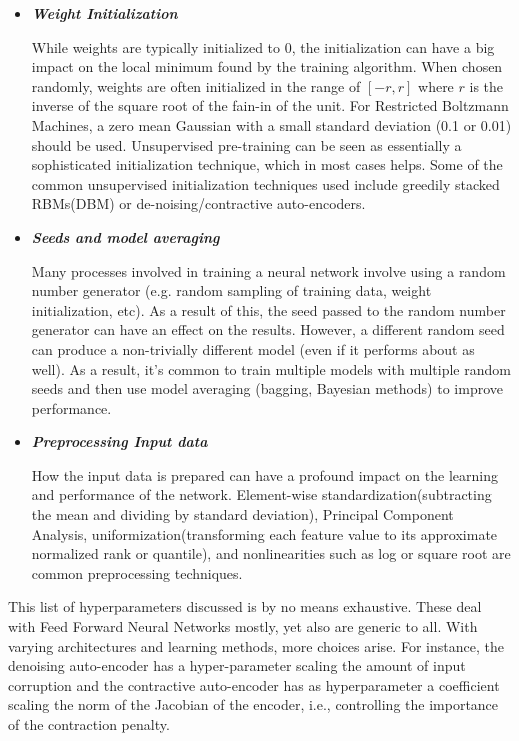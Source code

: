 \documentclass[twoside]{article}
\begin{document}
\begin{itemize}
\item \textit{\textbf{Weight Initialization}}

While weights are typically initialized to 0, the initialization can have a big impact on the local minimum found by the training algorithm. When chosen randomly, weights are often initialized in the range of $[-r,r]$ where $r$ is the inverse of the square root of the fain-in of the unit. For Restricted Boltzmann Machines, a zero mean Gaussian with a small standard deviation (0.1 or 0.01) should be used. Unsupervised pre-training can be seen as essentially a sophisticated initialization technique, which in most cases helps. Some of the common unsupervised initialization techniques used include greedily stacked RBMs(DBM) or de-noising/contractive auto-encoders.
\item \textit{\textbf{Seeds and model averaging}}

Many processes involved in training a neural network involve using a random number generator (e.g. random sampling of training data, weight initialization, etc). As a result of this, the seed passed to the random number generator can have an effect on the results. However, a different random seed can produce a non-trivially different model (even if it performs about as well). As a result, it’s common to train multiple models with multiple random seeds and then use model averaging (bagging, Bayesian methods) to improve performance.


\item \textit{\textbf{Preprocessing Input data}}

How the input data is prepared can have a profound impact on the learning and performance of the network. Element-wise standardization(subtracting the mean and dividing by standard deviation), Principal Component Analysis, uniformization(transforming each feature value to its approximate normalized rank or quantile), and nonlinearities such as log or square root are common preprocessing techniques.\cite{bengio2012practical}
\end{itemize}

This list of hyperparameters discussed is by no means exhaustive. These deal with Feed Forward Neural Networks mostly, yet also are generic to all. With varying architectures and learning methods, more choices arise. For instance, the denoising auto-encoder has a hyper-parameter scaling the amount of input corruption and the contractive auto-encoder has as hyperparameter a coefficient scaling the norm of the Jacobian of the encoder, i.e., controlling the importance of the contraction penalty. \cite{bengio2012practical}
\end{document}
